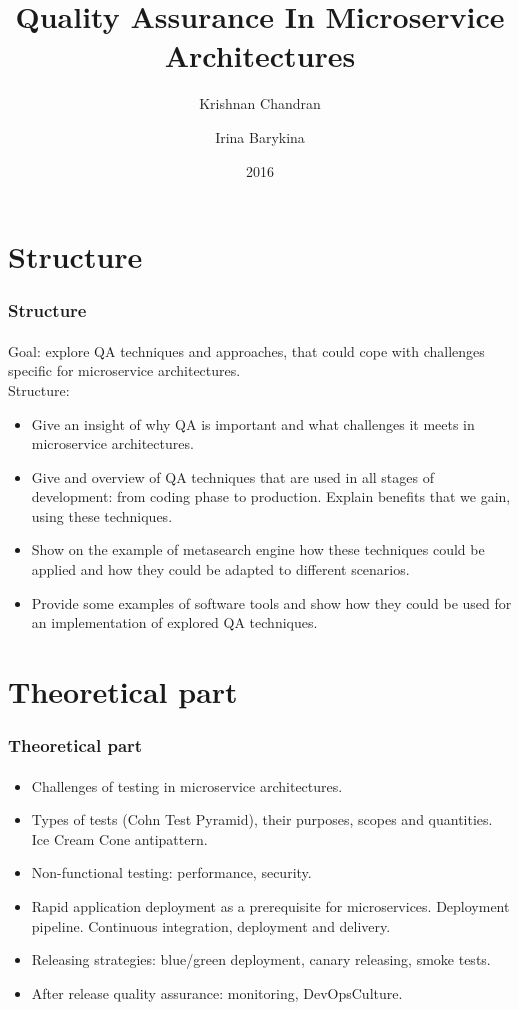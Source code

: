 \documentclass{beamer}
\title{Quality Assurance In Microservice Architectures}
\author{Krishnan Chandran \and Irina Barykina}
\institute[NYU]
{
Department of Informatics,\\
Intelligent Adaptive Systems, UHH\\
}
\date{2016}
\begin{document}
\begin{frame}
\titlepage
\end{frame}


\section{Structure}
\begin{frame}
	\frametitle{Structure}	
	\framesubtitle{}
	Goal: explore QA techniques and approaches, that could cope with challenges specific for microservice architectures. \\
	Structure:
	\begin{itemize}
		\item Give an insight of why QA is important and what challenges it meets in microservice architectures. 
 		\item Give and overview of QA techniques that are used in all stages of development: from coding phase to production. Explain benefits that we gain, using these 	   techniques. 
		\item Show on the example of metasearch engine how these techniques could be applied and how they could be adapted to different scenarios.
		\item Provide some examples of software tools and show how they could be used for an implementation of explored QA techniques.
	\end{itemize}
\end{frame}

\section{Theoretical part}
\begin{frame}
	\frametitle{Theoretical part}	
	\framesubtitle{}

	\begin{itemize}
 		 \item Challenges of testing in microservice architectures.
		 \item Types of tests (Cohn Test Pyramid), their purposes, scopes and quantities. Ice Cream Cone antipattern.
		 \item Non-functional testing: performance, security.
		 \item Rapid application deployment as a prerequisite for microservices. Deployment pipeline. Continuous integration, deployment and delivery.
		 \item Releasing strategies: blue/green deployment, canary releasing, smoke tests.
		 \item After release quality assurance: monitoring, DevOpsCulture. 
	\end{itemize}
\end{frame}
\end{document}
